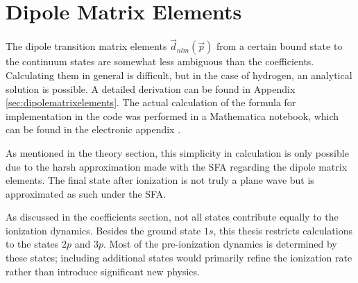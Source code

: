 





\section{Dipole Matrix Elements}
The dipole transition matrix elements $\vec{d}_{nlm}(\vec{p})$ from a certain bound state to the continuum states are somewhat less ambiguous than the coefficients. 
Calculating them in general is difficult, but in the case of hydrogen, an analytical solution is possible. A detailed derivation can be found in Appendix \ref{sec:dipolematrixelements}. 
The actual calculation of the formula for implementation in the code was performed in a Mathematica notebook, which can be found in the electronic appendix \cite{johannes_porsch_2025_16223179}.

As mentioned in the theory section, this simplicity in calculation is only possible due to the harsh approximation made with the SFA regarding the dipole matrix elements. 
The final state after ionization is not truly a plane wave but is approximated as such under the SFA.

As discussed in the coefficients section, not all states contribute equally to the ionization dynamics. 
Besides the ground state $1s$, this thesis restricts calculations to the states $2p$ and $3p$. Most of the pre-ionization dynamics is determined by these states; including additional states would primarily refine the ionization rate rather than introduce significant new physics.


